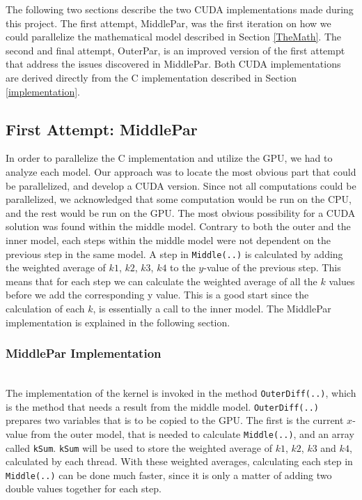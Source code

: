 The following two sections describe the two CUDA implementations made during this project. The first attempt, MiddlePar, was the first iteration on how we could parallelize the mathematical model described in Section \ref{TheMath}. The second and final attempt, OuterPar, is an improved version of the first attempt that address the issues discovered in MiddlePar. Both CUDA implementations are derived directly from the C implementation described in Section \ref{implementation}.

\subsection{First Attempt: MiddlePar}
\label{sec:firstattempt}
In order to parallelize the C implementation and utilize the GPU, we had to analyze each model. Our approach was to locate the most obvious part that could be parallelized, and develop a CUDA version. Since not all computations could be parallelized, we acknowledged that some computation would be run on the CPU, and the rest would be run on the GPU. The most obvious possibility for a CUDA solution was found within the middle model. Contrary to both the outer and the inner model, each steps within the middle model were not dependent on the previous step in the same model. A step in \texttt{Middle(..)} is calculated by adding the weighted average of $k1$, $k2$, $k3$, $k4$ to the $y$-value of the previous step. This means that for each step we can calculate the weighted average of all the $k$ values before we add the corresponding y value. This is a good start since the calculation of each $k$, is essentially a call to the inner model. The MiddlePar implementation is explained in the following section.

\subsubsection{MiddlePar Implementation} \hfill\\
The implementation of the kernel is invoked in the method \texttt{OuterDiff(..)}, which is the method that needs a result from the middle model. \texttt{OuterDiff(..)} prepares two variables that is to be copied to the GPU. The first is the current $x$-value from the outer model, that is needed to calculate \texttt{Middle(..)}, and an array called \texttt{kSum}. \texttt{kSum} will be used to store the weighted average of $k1$, $k2$, $k3$ and $k4$, calculated by each thread. With these weighted averages, calculating each step in \texttt{Middle(..)} can be done much faster, since it is only a matter of adding two double values together for each step. \\ \\

